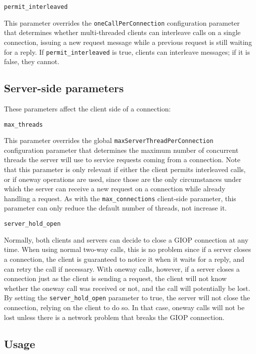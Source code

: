 \documentclass[11pt,oneside,a4paper]{book}
\makeatletter
\newcommand{\code}[1]{\texttt{#1}}
\newcommand{\confoptnd}[1]
  {\vspace{\baselineskip}\par\noindent\code{#1}}
\renewcommand{\confoptnd}[1]
  {\vspace{\baselineskip}\par\noindent\code{#1}\\[-1ex]\@afterheading}
\makeatother
\begin{document}
\confoptnd{permit\_interleaved}

This parameter overrides the \code{oneCallPerConnection} configuration
parameter that determines whether multi-threaded clients can
interleave calls on a single connection, issuing a new request message
while a previous request is still waiting for a reply. If
\code{permit\_interleaved} is true, clients can interleave messages;
if it is false, they cannot.


\subsection{Server-side parameters}

These parameters affect the client side of a connection:

\confoptnd{max\_threads}

This parameter overrides the global
\code{maxServerThreadPerConnection} configuration parameter that
determines the maximum number of concurrent threads the server will
use to service requests coming from a connection. Note that this
parameter is only relevant if either the client permits interleaved
calls, or if oneway operations are used, since those are the only
circumstances under which the server can receive a new request on a
connection while already handling a request. As with the
\code{max\_connections} client-side parameter, this parameter can only
reduce the default number of threads, not increase it.

\confoptnd{server\_hold\_open}

Normally, both clients and servers can decide to close a GIOP
connection at any time. When using normal two-way calls, this is no
problem since if a server closes a connection, the client is
guaranteed to notice it when it waits for a reply, and can retry the
call if necessary. With oneway calls, however, if a server closes a
connection just as the client is sending a request, the client will
not know whether the oneway call was received or not, and the call
will potentially be lost. By setting the \code{server\_hold\_open}
parameter to true, the server will not close the connection, relying
on the client to do so. In that case, oneway calls will not be lost
unless there is a network problem that breaks the GIOP connection.


\subsection{Usage}
\end{document}
